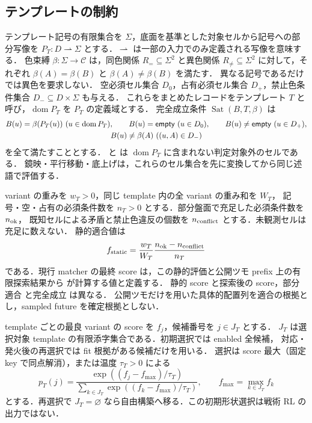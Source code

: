 \subsection{テンプレートの制約}
テンプレート記号の有限集合を $\Sigma$，底面を基準とした対象セルから記号への部分写像を
$P_T:D\rightharpoonup\Sigma$ とする．$\rightharpoonup$ は一部の入力でのみ定義される写像を意味する．
色束縛 $\beta:\Sigma\to\mathcal C$ は，同色関係 $R_=\subseteq\Sigma^2$ と異色関係
$R_{\ne}\subseteq\Sigma^2$ に対して，それぞれ $\beta(A)=\beta(B)$ と $\beta(A)\ne\beta(B)$ を満たす．
異なる記号であるだけでは異色を要求しない．
空必須セル集合 $D_0$，占有必須セル集合 $D_+$，禁止色条件集合 $D_-\subseteq D\times\Sigma$ も与える．
これらをまとめたレコードをテンプレート $T$ と呼び，$\operatorname{dom}P_T$ を $P_T$ の定義域とする．
完全成立条件 $\operatorname{Sat}(B,T,\beta)$ は
\begin{equation}\label{eq:template}
 \begin{gathered}
 B(u)=\beta(P_T(u))\ (u\in\operatorname{dom}P_T),\qquad
 B(u)=\mathsf{empty}\ (u\in D_0),\qquad B(u)\ne\mathsf{empty}\ (u\in D_+),\\
 B(u)\ne\beta(A)\ ((u,A)\in D_-)
 \end{gathered}
\end{equation}
を全て満たすこととする．
 と \code{*} は $\operatorname{dom}P_T$ に含まれない判定対象外のセルである．
鏡映・平行移動・底上げは，これらのセル集合を先に変換してから同じ述語で評価する．

variant の重みを $w_T>0$，同じ template 内の全 variant の重み和を $W_T$，
記号・空・占有の必須条件数を $n_T>0$ とする．部分盤面で充足した必須条件数を $n_{\rm ok}$，
既知セルによる矛盾と禁止色違反の個数を $n_{\rm conflict}$ とする．未観測セルは充足に数えない．
静的適合値は
\begin{equation}\label{eq:static-fit}
 f_{\rm static}=\frac{w_T}{W_T}\frac{n_{\rm ok}-n_{\rm conflict}}{n_T}
\end{equation}
である．現行 matcher の最終 score は，この静的評価と公開ツモ prefix 上の有限探索結果から
 が計算する値と定義する．
静的 score と探索後の score，部分適合  と完全成立  は異なる．
公開ツモだけを用いた具体的配置列を適合の根拠とし，sampled future を確定根拠としない．

template ごとの最良 variant の score を $f_j$，候補番号を $j\in J_T$ とする．
$J_T$ は選択対象 template の有限添字集合である．初期選択では enabled 全候補，
対応・発火後の再選択では fit 根拠がある候補だけを用いる．
選択は score 最大（固定 key で同点解消），または温度 $\tau_T>0$ による
\begin{equation}\label{eq:template-softmax}
 p_T(j)=\frac{\exp((f_j-f_{\max})/\tau_T)}{\sum_{k\in J_T}\exp((f_k-f_{\max})/\tau_T)},
 \qquad f_{\max}=\max_{k\in J_T}f_k
\end{equation}
とする．再選択で $J_T=\varnothing$ なら自由構築へ移る．この初期形状選択は戦術 RL の出力ではない．

